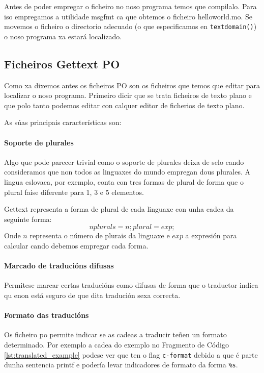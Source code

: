 Antes de poder empregar o ficheiro no noso programa temos que compilalo. Para iso empregamos a utilidade msgfmt ca que obtemos o ficheiro helloworld.mo. Se movemos o ficheiro o directorio adecuado (o que especificamos en \lstinline{textdomain()}) o noso programa xa estará localizado.


\subsection{Ficheiros Gettext PO}
Como xa dixemos antes os ficheiros PO son os ficheiros que temos que editar para localizar o noso programa. Primeiro dicir que se trata ficheiros de texto plano e que polo tanto podemos editar con calquer editor de ficherios de texto plano.

As súas principais características son:

\paragraph{Soporte de plurales}
Algo que pode parecer trivial como o soporte de plurales deixa de selo cando consideramos que non todos as linguaxes do mundo empregan dous plurales. A lingua eslovaca, por exemplo, conta con tres formas de plural de forma que o plural faise diferente para 1, 3 e 5 elementos.

Gettext representa a forma de plural de cada linguaxe con unha cadea da seguinte forma: $$nplurals=n; plural=exp;$$ Onde $n$ representa o número de plurais da linguaxe e $exp$ a expresión para calcular cando debemos empregar cada forma.

\paragraph {Marcado de traducións difusas}
Permitese marcar certas traducións como difusas de forma que o traductor indica qu enon está seguro de que dita tradución sexa correcta.

\paragraph {Formato das traducións}
Os ficheiro po permite indicar se as cadeas a traducir teñen un formato determinado. Por exemplo a cadea do exemplo no Fragmento de Código \ref{lst:translated_example} podese ver que ten o flag \lstinline{c-format} debido a que é parte dunha sentencia printf e podería levar indicadores de formato da forma \lstinline{%s}.

